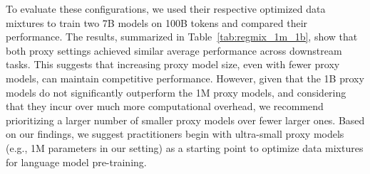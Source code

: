To evaluate these configurations, we used their respective optimized data mixtures to train two 7B models on 100B tokens and compared their performance. The results, summarized in Table~\ref{tab:regmix_1m_1b}, show that both proxy settings achieved similar average performance across downstream tasks. This suggests that increasing proxy model size, even with fewer proxy models, can maintain competitive performance. However, given that the 1B proxy models do not significantly outperform the 1M proxy models, and considering that they incur over much more computational overhead, we recommend prioritizing a larger number of smaller proxy models over fewer larger ones. Based on our findings, we suggest practitioners begin with ultra-small proxy models (e.g., 1M parameters in our setting) as a starting point to optimize data mixtures for language model pre-training.
